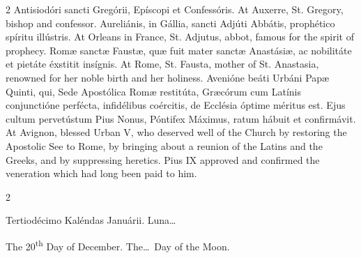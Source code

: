\begin{paracol}{2}
Antisiodóri sancti Gregórii, Epíscopi et Confessóris.
\switchcolumn
{}
At Auxerre, St. Gregory, bishop and confessor.
\switchcolumn*
{}
Aureliánis, in Gállia, sancti Adjúti Abbátis, prophético spíritu illústris.
\switchcolumn
{}
At Orleans in France, St. Adjutus, abbot, famous for the spirit of prophecy.
\switchcolumn*
{}
Romæ sanctæ Faustæ, quæ fuit mater sanctæ 
 Anastásiæ, ac nobilitáte et pietáte éxstitit insígnis.
\switchcolumn
{}
At Rome, St. Fausta, mother of St. Anastasia, renowned for her noble birth 
 and her holiness.
\switchcolumn*
{}
Avenióne beáti Urbáni Papæ Quinti, qui, Sede 
 Apostólica Romæ restitúta, Græcórum cum Latínis conjunctióne perfécta, 
 infidélibus coércitis, de Ecclésia óptime méritus est. Ejus cultum 
 pervetústum Pius Nonus, Póntifex Máximus, ratum hábuit et confirmávit.
\switchcolumn
{}
At 
 Avignon, blessed Urban V, who deserved well of the Church by restoring the 
 Apostolic See to Rome, by bringing about a reunion of the Latins and the 
 Greeks, and by suppressing heretics. Pius IX approved and confirmed 
 the veneration which had long been paid to him.
\switchcolumn*
{}
\end{paracol}


\begin{paracol}{2}
\begin{center}{\color{gregoriocolor} Tertiodécimo Kaléndas Januárii. 
 Luna\dots\ }\end{center}
\switchcolumn
{}
\begin{center}{\color{gregoriocolor} The 
 20\textsuperscript{th} Day of 
 December. The\dots\ Day of the Moon.}\end{center}
\end{paracol}

